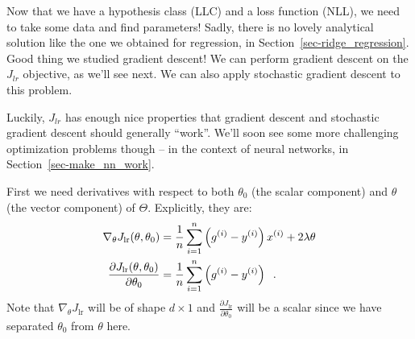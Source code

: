 Now that we have a hypothesis class (LLC) and a loss function (NLL),
we need to take some data and find parameters!
Sadly, there is no lovely analytical solution like the one we obtained
for regression, in Section~\ref{sec-ridge_regression}.  Good thing we
studied gradient descent!  We can perform gradient descent on the
$J_{lr}$ objective, as we'll see next.  We can also apply stochastic
gradient descent to this problem.

Luckily, $J_{lr}$ has enough nice properties that gradient descent and
stochastic gradient descent should generally ``work''. We'll soon see
some more challenging optimization problems though -- in the
context of neural networks, in Section~\ref{sec-make_nn_work}.

First we need derivatives with respect to both $\theta_0$ (the scalar
component) and $\theta$ (the vector component) of $\Theta$.
Explicitly, they are: 
\begin{align*}
  \nabla_\theta J_\text{lr}(\theta, \theta_0)                      & =  \frac{1}{n}\sum_{i=1}^n
  \left(g^{(i)} -
  y^{(i)}\right) x^{(i)}
  + 2\lambda\theta                                                                              \\
  \frac{\partial J_\text{lr}(\theta, \theta_0)}{\partial \theta_0} & =
  \frac{1}{n}\sum_{i=1}^n
  \left(g^{(i)} -
  y^{(i)} \right) \;\;.
\end{align*}
Note that $\nabla_\theta J_\text{lr}$ will be of shape $d \times 1$ and
$\frac{\partial J_\text{lr}}{\partial \theta_0}$ will be a scalar since
we have separated $\theta_0$ from $\theta$ here.




